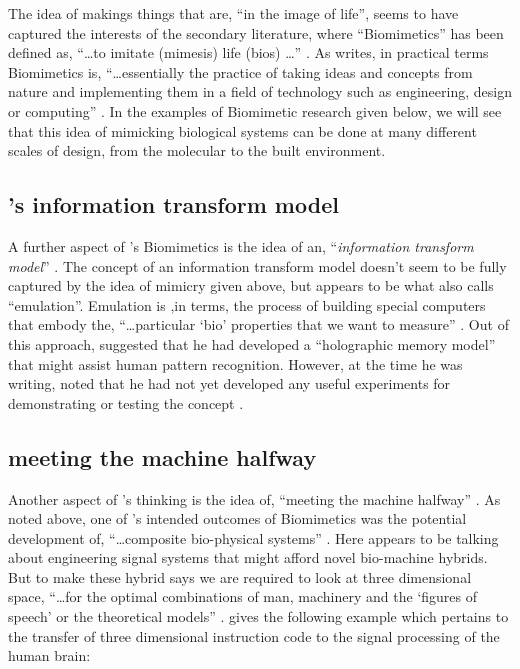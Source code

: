 The idea of makings things that are, ``in the image of life'', seems to have captured the interests of the secondary literature, where ``Biomimetics'' has been defined as, ``\dots to imitate (mimesis) life (bios) \dots'' \cite[p.54]{kaufmann_biomimetics_2015}. As \citeauthor{ayre_biomimicry_2004} writes, in practical terms Biomimetics is, ``\dots essentially the practice of taking ideas and concepts from nature and implementing them in a field of technology such as engineering, design or computing'' \cite[p.~4]{ayre_biomimicry_2004}. In the examples of Biomimetic research given below, we will see that this idea of mimicking biological systems can be done at many different scales of design, from the molecular to the built environment. 

\subsection{\citeauthor{schmitt_biomimetic_1973}'s information transform model}
\label{sec:information:transform}

A further aspect of \citeauthor{schmitt_signals_1963}'s Biomimetics is the idea of an, ``\textit{information transform model}'' \cite[p.~297]{schmitt_interesting_1969}. The concept of an information transform model doesn't seem to be fully captured by the idea of mimicry given above, but appears to be what \citeauthor{schmitt_signals_1963} also calls ``emulation''. Emulation is ,in \citeauthor{schmitt_signals_1963} terms, the process of building special computers that embody the, ``\dots particular `bio' properties that we want to measure'' \cite[p.~92]{schmitt_signals_1963}. Out of this approach, \citeauthor{schmitt_interesting_1969} suggested that he had developed a ``holographic memory model'' that might assist human pattern recognition. However, at the time he was writing, \citeauthor{schmitt_interesting_1969} noted that he had not yet developed any useful experiments for demonstrating or testing the concept \citep{schmitt_interesting_1969}. 

\subsection{\citeauthor{schmitt_biomimetic_1973} meeting the machine halfway}
\label{sec:meeting:machine}

Another aspect of \citeauthor{schmitt_signals_1963}'s thinking is the idea of, ``meeting the machine halfway'' \cite[p.~91]{schmitt_signals_1963}. As noted above, one of \citeauthor{schmitt_signals_1963}'s intended outcomes of Biomimetics was the potential development of, ``\dots composite bio-physical systems'' \cite[p.~90]{schmitt_signals_1963}. Here \citeauthor{schmitt_signals_1963} appears to be talking about engineering signal systems that might afford novel bio-machine hybrids. But to make these hybrid \citeauthor{schmitt_signals_1963} says we are required to look at three dimensional space, ``\dots for the optimal combinations of man, machinery and the `figures of speech' or the theoretical models'' \cite[p.~91]{schmitt_signals_1963}. \citeauthor{schmitt_signals_1963} gives the following example which pertains to the transfer of three dimensional instruction code to the signal processing of the human brain:

